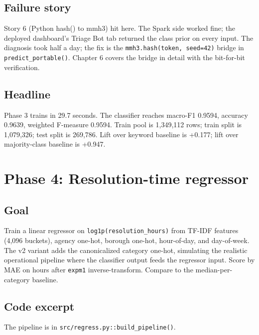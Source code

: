 \documentclass[11pt,letterpaper]{book}
\begin{document}
\subsection*{Failure story}

Story 6 (Python hash() to mmh3) hit here. The Spark side worked fine; the deployed dashboard's Triage Bot tab returned the class prior on every input. The diagnosis took half a day; the fix is the \texttt{mmh3.hash(token, seed=42)} bridge in \texttt{predict\_portable()}. Chapter 6 covers the bridge in detail with the bit-for-bit verification.

\subsection*{Headline}

Phase 3 trains in 29.7 seconds. The classifier reaches macro-F1 0.9594, accuracy 0.9639, weighted F-measure 0.9594. Train pool is 1,349,112 rows; train split is 1,079,326; test split is 269,786. Lift over keyword baseline is +0.177; lift over majority-class baseline is +0.947.

\section{Phase 4: Resolution-time regressor}
\label{sec:phase4}

\subsection*{Goal}

Train a linear regressor on \texttt{log1p(resolution\_hours)} from TF-IDF features (4,096 buckets), agency one-hot, borough one-hot, hour-of-day, and day-of-week. The v2 variant adds the canonicalized category one-hot, simulating the realistic operational pipeline where the classifier output feeds the regressor input. Score by MAE on hours after \texttt{expm1} inverse-transform. Compare to the median-per-category baseline.

\subsection*{Code excerpt}

The pipeline is in \texttt{src/regress.py::build\_pipeline()}.
\end{document}
